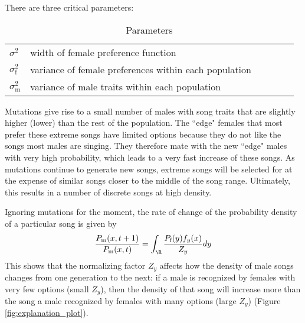 \documentclass{article}\usepackage[]{graphicx}\usepackage[]{color}
\newcommand{\ra}[1]{\renewcommand{\arraystretch}{#1}}
\begin{document}
There are three critical parameters:
\begin{table}
\caption{\label{parameters} Parameters}
\ra{1.3}
\begin{tabular}{llllll}
$\sigma^2$ & width of female preference function
\\$\sigma_\text{f}^2$ & variance of female preferences within each population
\\$\sigma_\text{m}^2$ & variance of male traits within each population
\end{tabular}
\end{table}

Mutations give rise to a small number of males with song traits that are slightly higher (lower) than the rest of the population. The ``edge" females that most prefer these extreme songs have limited options because they do not like the songs most males are singing. They therefore mate with the new ``edge" males with very high probability, which leads to a very fast increase of these songs. As mutations continue to generate new songs, extreme songs will be selected for at the expense of similar songs closer to the middle of the song range. Ultimately, this results in a number of discrete songs at high density.

Ignoring mutations for the moment, the rate of change of the probability density of a particular song is given by 
\begin{equation}
\frac{P_\text{m}(x,t+1)}{P_\text{m}(x,t)}= \int _\R\frac{ P_\text{f}(y)f_y(x)}{Z_y}dy \label{growth}
\end{equation}
This shows that the normalizing factor $Z_y$ affects how the density of male songs changes from one generation to the next: if a male is recognized by females with very few options (small $Z_y$), then the density of that song will increase more than the song a male recognized by females with many options (large $Z_y$) (Figure \ref{fig:explanation_plot}).
\end{document}
